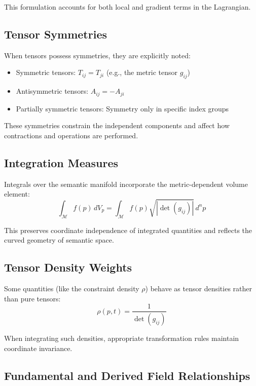 This formulation accounts for both local and gradient terms in the Lagrangian.

\subsection{Tensor Symmetries}

When tensors possess symmetries, they are explicitly noted:
\begin{itemize}
    \item Symmetric tensors: \(T_{ij} = T_{ji}\) (e.g., the metric tensor \(g_{ij}\))
    \item Antisymmetric tensors: \(A_{ij} = -A_{ji}\)
    \item Partially symmetric tensors: Symmetry only in specific index groups
\end{itemize}

These symmetries constrain the independent components and affect how contractions and operations are performed.

\subsection{Integration Measures}

Integrals over the semantic manifold incorporate the metric-dependent volume element:
\begin{equation}
\int_{\mathcal{M}} f(p) \, dV_p = \int_{\mathcal{M}} f(p) \sqrt{|\det(g_{ij})|} \, d^n p
\end{equation}

This preserves coordinate independence of integrated quantities and reflects the curved geometry of semantic space.

\subsection{Tensor Density Weights}

Some quantities (like the constraint density \(\rho\)) behave as tensor densities rather than pure tensors:
\begin{equation}
\rho(p,t) = \frac{1}{\det(g_{ij})}
\end{equation}

When integrating such densities, appropriate transformation rules maintain coordinate invariance.

\subsection{Fundamental and Derived Field Relationships}


